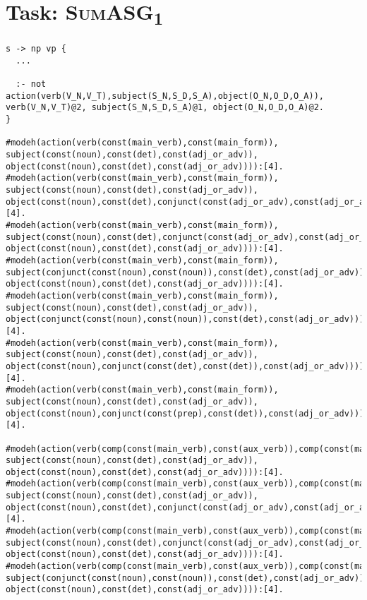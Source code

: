 \vspace{5pt}

\section{Task: \textsc{SumASG\textsubscript{1}}}
\label{sec:appendix_asg_1}

\begin{lstlisting}
s -> np vp {
  ...
  
  :- not action(verb(V_N,V_T),subject(S_N,S_D,S_A),object(O_N,O_D,O_A)), verb(V_N,V_T)@2, subject(S_N,S_D,S_A)@1, object(O_N,O_D,O_A)@2.
}

#modeh(action(verb(const(main_verb),const(main_form)), subject(const(noun),const(det),const(adj_or_adv)), object(const(noun),const(det),const(adj_or_adv)))):[4].
#modeh(action(verb(const(main_verb),const(main_form)), subject(const(noun),const(det),const(adj_or_adv)), object(const(noun),const(det),conjunct(const(adj_or_adv),const(adj_or_adv))))):[4].
#modeh(action(verb(const(main_verb),const(main_form)), subject(const(noun),const(det),conjunct(const(adj_or_adv),const(adj_or_adv))), object(const(noun),const(det),const(adj_or_adv)))):[4].
#modeh(action(verb(const(main_verb),const(main_form)), subject(conjunct(const(noun),const(noun)),const(det),const(adj_or_adv)), object(const(noun),const(det),const(adj_or_adv)))):[4].
#modeh(action(verb(const(main_verb),const(main_form)), subject(const(noun),const(det),const(adj_or_adv)), object(conjunct(const(noun),const(noun)),const(det),const(adj_or_adv)))):[4].
#modeh(action(verb(const(main_verb),const(main_form)), subject(const(noun),const(det),const(adj_or_adv)), object(const(noun),conjunct(const(det),const(det)),const(adj_or_adv)))):[4].
#modeh(action(verb(const(main_verb),const(main_form)), subject(const(noun),const(det),const(adj_or_adv)), object(const(noun),conjunct(const(prep),const(det)),const(adj_or_adv)))):[4].

#modeh(action(verb(comp(const(main_verb),const(aux_verb)),comp(const(main_form),const(aux_form))), subject(const(noun),const(det),const(adj_or_adv)), object(const(noun),const(det),const(adj_or_adv)))):[4].
#modeh(action(verb(comp(const(main_verb),const(aux_verb)),comp(const(main_form),const(aux_form))), subject(const(noun),const(det),const(adj_or_adv)), object(const(noun),const(det),conjunct(const(adj_or_adv),const(adj_or_adv))))):[4].
#modeh(action(verb(comp(const(main_verb),const(aux_verb)),comp(const(main_form),const(aux_form))), subject(const(noun),const(det),conjunct(const(adj_or_adv),const(adj_or_adv))), object(const(noun),const(det),const(adj_or_adv)))):[4].
#modeh(action(verb(comp(const(main_verb),const(aux_verb)),comp(const(main_form),const(aux_form))), subject(conjunct(const(noun),const(noun)),const(det),const(adj_or_adv)), object(const(noun),const(det),const(adj_or_adv)))):[4].


\end{lstlisting}
